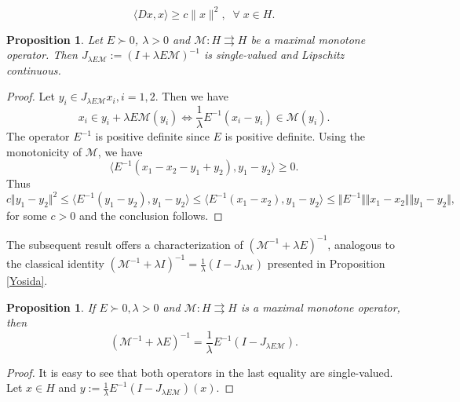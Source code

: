 \documentclass[11pt]{article}
\theoremstyle{plain}
\newtheorem{definition}{Definition}
\newtheorem{proposition}[theorem]{Proposition}
\begin{document}
{\begin{itemize}
$$
\langle Dx,x \rangle \ge c\|x\|^2,\;\;\forall\;x\in H.
$$
\end{itemize}
\begin{proposition}
Let {$E\succ 0$}, $\lambda >0$ and $\mathcal{M}:  {H} \rightrightarrows  {H}$ be a maximal monotone operator. Then  $J_{\lambda E\mathcal{M}}:=(I+\lambda E\mathcal{M})^{-1}$ is single-valued and Lipschitz continuous.
\end{proposition}
\begin{proof}
Let $y_i\in J_{\lambda E\mathcal{M}}x_i, i=1, 2.$ Then we have 
$$
x_i\in y_i+\lambda E\mathcal{M} (y_i) \Leftrightarrow \frac{1}{\lambda}E^{-1}(x_i-y_i)\in \mathcal{M}(y_i).
$$
The {operator} $E^{-1}$ is positive definite since $E$ is positive definite.  Using the monotonicity of $\mathcal{M}$, we have 
$$
\langle E^{-1}(x_1-x_2-y_1+y_2), y_1-y_2 \rangle \ge 0.
$$
Thus 
$$
c\Vert y_1-y_2\Vert^2\le \langle E^{-1}(y_1-y_2), y_1-y_2\rangle\le \langle E^{-1}(x_1-x_2), y_1-y_2 \rangle \le \Vert  E^{-1}\Vert \Vert x_1-x_2\Vert \Vert y_1-y_2\Vert,
$$
for some $c>0$ and the conclusion follows. 
\end{proof}
{The subsequent result offers a characterization of  $(\mathcal{M}^{-1} + \lambda E)^{-1}$, analogous to the classical identity $(\mathcal{M}^{-1} + \lambda I)^{-1} = \frac{1}{\lambda}(I - J_{\lambda \mathcal{M}})$ presented in Proposition \ref{Yosida}.}
\begin{proposition}\label{formula}
If {$E\succ0, \lambda>0$} and $\mathcal{M}:  {H} \rightrightarrows  {H}$ is a maximal monotone operator,  then 
$$
(\mathcal{M}^{-1}+\lambda E)^{-1}=\frac{1}{\lambda}E^{-1}(I-J_{\lambda E\mathcal{M}}).
$$
\end{proposition}
\begin{proof}
{It is easy to see that both operators in the last equality are single-valued}. Let $x\in H$ and $y:=\frac{1}{\lambda}E^{-1}(I-J_{\lambda E\mathcal{M}})(x)$. 

\end{proof}}
\end{document}
